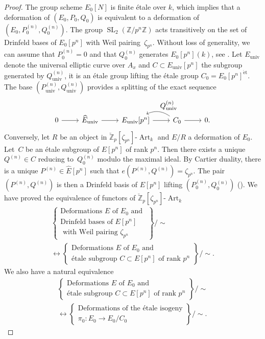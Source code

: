 \documentclass[JEP,XML,SOM,Unicode,published]{cedram}
\let\ts\textstyle
\newcommand{\et}{\mathrm{\acute{e}t}}
\newcommand{\univ}{\mathrm{univ}}
\numberwithin{equation}{section}
\theoremstyle{definition}
\newcommand{\bb}[1]{\mathbb{#1}}
\DeclareMathOperator{\SL}{SL}
\DeclareMathOperator{\Art}{Art}
\begin{document}
\begin{proof}
The group scheme $E_0[N]$ is finite étale over $k$, which implies that a deformation of $(E_0,P_0,Q_0)$ is equivalent to a deformation of $(E_0,P_0^{(n)},Q_0^{(n)})$. The group $\SL_2(\bb{Z}/p^n\bb{Z})$ acts transitively on the set of Drinfeld bases of $E_0[p^n]$ with Weil pairing~$\zeta_{p^n}$. Without loss of generality, we can assume that $P_0^{(n)}=0$ and that $Q_0^{(n)}$ generates $E_0[p^n](k)$, see \cite[Th.\,5.5.2]{katz1985arithmetic}. Let $E_{\univ}$ denote the universal elliptic curve over $A_{x}$ and $C\subset E_{\univ}[p^n]$ the subgroup generated by $Q^{(n)}_{\univ}$, it is an étale group lifting the étale group $C_0=E_0[p^n]^{\et}$. The base $(P_{\univ}^{(n)},Q_{\univ}^{(n)})$ provides a splitting of the exact sequence
\[
\begin{tikzcd}
0 \ar[r] & \widehat{E}_{\univ} \ar[r] & E_{\univ}[p^n] \ar[r, ] & C_0 \ar[r] \ar[l, bend right, "\ts Q_{\univ}^{(n)}"'] & 0.
\end{tikzcd}
\]
Conversely, let $R$ be an object in $\breve{\bb{Z}}_p[\zeta_{p^n}]\mbox{-}\Art_k$ and $E/R$ a deformation of $E_0$. Let~$C$ be an étale subgroup of $E[p^n]$ of rank $p^n$. Then there exists a unique $Q^{(n)}\in C$ reducing to~$Q_0^{(n)}$ modulo the maximal ideal. By Cartier duality, there is a unique \hbox{$P^{(n)}\!\in\!\widehat{E}[p^n]$} such that $e(P^{(n)}, Q^{(n)})=\zeta_{p^n}$. The pair $(P^{(n)},Q^{(n)})$ is then a Drinfeld basis of $E[p^n]$ lifting $(P^{(n)}_0,Q^{(n)}_0)$ (\cf \cite[Prop.\,1.11.2]{katz1985arithmetic}). We have proved the equivalence of functors of $\breve{\bb{Z}}_p[\zeta_{p^n}]\mbox{-}\Art_k$
\begin{multline*}
\left\{ \substack{ \mbox{Deformations $E$ of $E_0$ and } \\ \mbox{Drinfeld bases of $E[p^n]$} \\ \mbox{ with Weil pairing $\zeta_{p^n}$} } \right\}\!\bigg/\!\sim\\ \longleftrightarrow \left\{ \substack{ \mbox{Deformations $E$ of $E_0$ and } \\ \mbox{étale subgroup $C\subset E[p^n]$ of rank $p^n$} } \right\}\!\Big/\! \sim.
\end{multline*}
We also have a natural equivalence
\begin{multline*}
\left\{ \substack{ \mbox{Deformations $E$ of $E_0$ and } \\ \mbox{étale subgroup $C\subset E[p^n]$ of rank $p^n$} } \right\}\! \Big/\!\sim\\ \longleftrightarrow \left\{ \substack{ \mbox{Deformations of the étale isogeny} \\ 	\mbox{$\pi_0: E_0\to E_0/C_0$} }\right\}\! \Big/\!\sim.

\end{multline*}
\end{proof}
\end{document}
